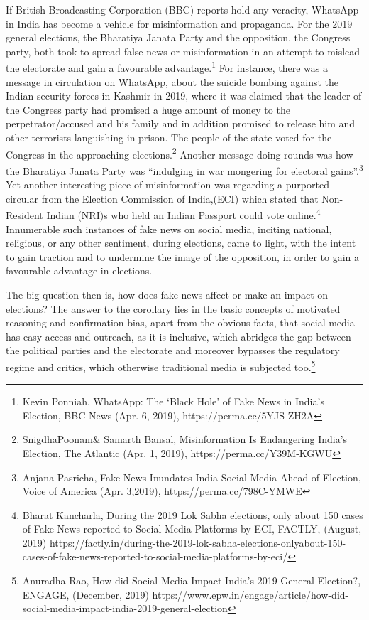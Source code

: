 \begin{multicols}{2}
If British Broadcasting Corporation (BBC) reports hold any veracity, WhatsApp in India has
become a vehicle for misinformation and propaganda. For the 2019 general elections, the
Bharatiya Janata Party and the opposition, the Congress party, both took to spread false news
or misinformation in an attempt to mislead the electorate and gain a favourable
advantage.\footnote{Kevin Ponniah, WhatsApp: The ‘Black Hole’ of Fake News in India’s Election, BBC News (Apr. 6,
2019), https://perma.cc/5YJS-ZH2A}
For instance, there was a message in circulation on WhatsApp, about the suicide
bombing against the Indian security forces in Kashmir in 2019, where it was claimed that the
leader of the Congress party had promised a huge amount of money to the
perpetrator/accused and his family and in addition promised to release him and other
terrorists languishing in prison. The people of the state voted for the Congress in the 
approaching elections.\footnote{SnigdhaPoonam& Samarth Bansal, Misinformation Is Endangering India’s Election, The Atlantic (Apr. 1,
2019), https://perma.cc/Y39M-KGWU} Another message doing rounds was how the Bharatiya Janata Party
was “indulging in war mongering for electoral gains”.\footnote{Anjana Pasricha, Fake News Inundates India Social Media Ahead of Election, Voice of America (Apr. 3,2019), https://perma.cc/798C-YMWE} Yet another interesting piece of
misinformation was regarding a purported circular from the Election Commission of
India,(ECI) which stated that Non-Resident Indian (NRI)s who held an Indian Passport could
vote online.\footnote{Bharat Kancharla, During the 2019 Lok Sabha elections, only about 150 cases of Fake News reported to Social
Media Platforms by ECI, FACTLY, (August, 2019) https://factly.in/during-the-2019-lok-sabha-elections-onlyabout-150-cases-of-fake-news-reported-to-social-media-platforms-by-eci/ } Innumerable such instances of fake news on social media, inciting national,
religious, or any other sentiment, during elections, came to light, with the intent to gain
traction and to undermine the image of the opposition, in order to gain a favourable
advantage in elections.


The big question then is, how does fake news affect or make an impact on elections? The
answer to the corollary lies in the basic concepts of motivated reasoning and confirmation
bias, apart from the obvious facts, that social media has easy access and outreach, as it is
inclusive, which abridges the gap between the political parties and the electorate and
moreover bypasses the regulatory regime and critics, which otherwise traditional media is
subjected too.\footnote{Anuradha Rao, How did Social Media Impact India’s 2019 General Election?, ENGAGE, (December, 2019)
https://www.epw.in/engage/article/how-did-social-media-impact-india-2019-general-election}


\end{multicols}
